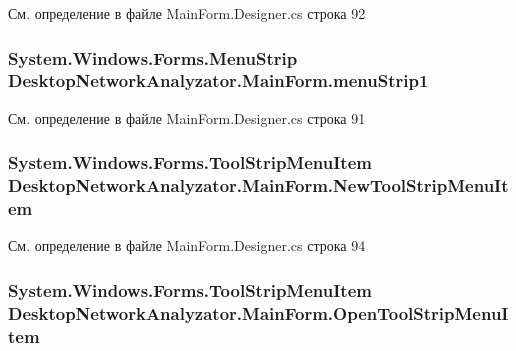См. определение в файле Main\+Form.\+Designer.\+cs строка 92

\subsubsection[{\texorpdfstring{menu\+Strip1}{menuStrip1}}]{\setlength{\rightskip}{0pt plus 5cm}System.\+Windows.\+Forms.\+Menu\+Strip Desktop\+Network\+Analyzator.\+Main\+Form.\+menu\+Strip1\hspace{0.3cm}{\ttfamily [private]}}\hypertarget{class_desktop_network_analyzator_1_1_main_form_a7fa592a22158b187ebfb71236adcc7ac}{}\label{class_desktop_network_analyzator_1_1_main_form_a7fa592a22158b187ebfb71236adcc7ac}


См. определение в файле Main\+Form.\+Designer.\+cs строка 91

\subsubsection[{\texorpdfstring{New\+Tool\+Strip\+Menu\+Item}{NewToolStripMenuItem}}]{\setlength{\rightskip}{0pt plus 5cm}System.\+Windows.\+Forms.\+Tool\+Strip\+Menu\+Item Desktop\+Network\+Analyzator.\+Main\+Form.\+New\+Tool\+Strip\+Menu\+Item\hspace{0.3cm}{\ttfamily [private]}}\hypertarget{class_desktop_network_analyzator_1_1_main_form_ae4b306685b46399668f12c7e1d8d6b23}{}\label{class_desktop_network_analyzator_1_1_main_form_ae4b306685b46399668f12c7e1d8d6b23}


См. определение в файле Main\+Form.\+Designer.\+cs строка 94

\subsubsection[{\texorpdfstring{Open\+Tool\+Strip\+Menu\+Item}{OpenToolStripMenuItem}}]{\setlength{\rightskip}{0pt plus 5cm}System.\+Windows.\+Forms.\+Tool\+Strip\+Menu\+Item Desktop\+Network\+Analyzator.\+Main\+Form.\+Open\+Tool\+Strip\+Menu\+Item\hspace{0.3cm}{\ttfamily [private]}}\hypertarget{class_desktop_network_analyzator_1_1_main_form_a4a9b853312eea96ef6ff4711d47e7b2a}{}\label{class_desktop_network_analyzator_1_1_main_form_a4a9b853312eea96ef6ff4711d47e7b2a}


